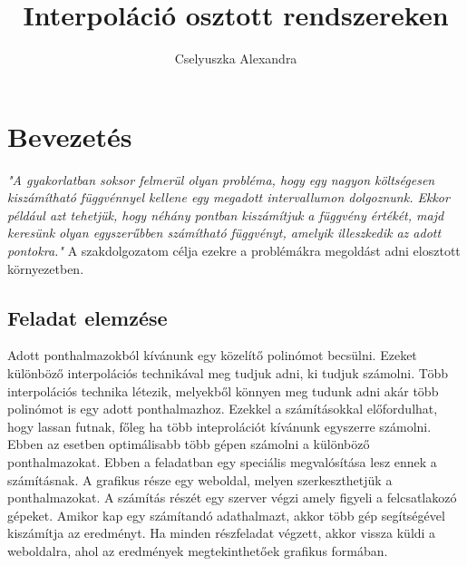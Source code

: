 \documentclass{elteikthesis}
\title{Interpoláció osztott rendszereken}
\author{Cselyuszka Alexandra}
\begin{document}
\frontmatter

	\maketitle

\mainmatter

\tableofcontents
	
\chapter{Bevezetés} 


\textit{
"A gyakorlatban soksor felmerül olyan probléma, hogy egy nagyon költségesen kiszámítható függvénnyel kellene egy megadott intervallumon dolgoznunk. Ekkor például azt tehetjük, hogy néhány pontban kiszámítjuk a függvény értékét, majd keresünk olyan egyszerűbben számítható függvényt, amelyik illeszkedik az adott pontokra." 	}
\cite{numanalbev}
\newline
\newline
A szakdolgozatom célja ezekre a problémákra megoldást adni elosztott környezetben. 
\section{Feladat elemzése}
Adott ponthalmazokból kívánunk egy közelítő polinómot becsülni. Ezeket különböző interpolációs technikával meg tudjuk adni, ki tudjuk számolni. Több interpolációs technika létezik, melyekből könnyen meg tudunk adni akár több polinómot is egy adott ponthalmazhoz.\newline
Ezekkel a számításokkal előfordulhat, hogy lassan futnak, főleg ha több inteprolációt kívánunk egyszerre számolni.
Ebben az esetben optimálisabb több gépen számolni a különböző ponthalmazokat.
\newline\newline
Ebben a feladatban egy speciális megvalósítása lesz ennek a számításnak. \newline
A grafikus része egy weboldal, melyen szerkeszthetjük a ponthalmazokat. A számítás részét egy szerver végzi amely figyeli a felcsatlakozó gépeket. Amikor kap egy számítandó adathalmazt, akkor több gép segítségével kiszámítja az eredményt. Ha minden részfeladat végzett, akkor vissza küldi a weboldalra, ahol az eredmények megtekinthetőek grafikus formában.
\newline\newline
\end{document}
